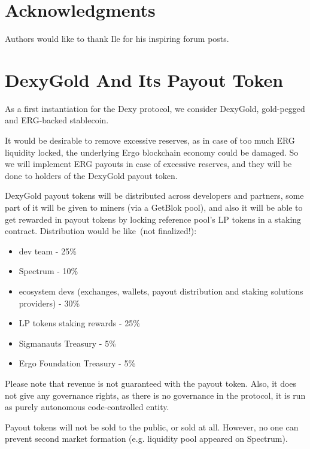 \documentclass{article}   %
\begin{document}
\section*{Acknowledgments}

Authors would like to thank Ile for his inspiring forum posts.

\section*{DexyGold And Its Payout Token}

As a first instantiation for the Dexy protocol, we consider DexyGold, gold-pegged and ERG-backed stablecoin. 

It would be desirable to remove excessive reserves, as in case of too much ERG liquidity locked, the underlying Ergo blockchain economy
could be damaged. So we will implement ERG payouts in case of excessive reserves, and they will be done to holders of the DexyGold payout token. 

DexyGold payout tokens will be distributed across developers and partners, some part of it will be given to miners (via a GetBlok pool), 
and also it will be able to get rewarded in payout tokens by locking reference pool's LP tokens in a staking contract.
Distribution would be like~(not finalized!):

\begin{itemize}
\item{dev team} - 25\%
\item{Spectrum} - 10\%
\item{ecosystem devs (exchanges, wallets, payout distribution and staking solutions providers)} - 30\%
\item{LP tokens staking rewards} - 25\%
\item{Sigmanauts Treasury} - 5\%
\item{Ergo Foundation Treasury} - 5\%
\end{itemize}


Please note that revenue is not guaranteed with the payout token. Also, it does not give any governance rights, as there is no governance in the protocol, it is run as purely autonomous code-controlled entity. 

Payout tokens will not be sold to the public, or sold at all. However, no one can prevent second market formation (e.g. liquidity pool appeared on Spectrum).







%
\end{document}
